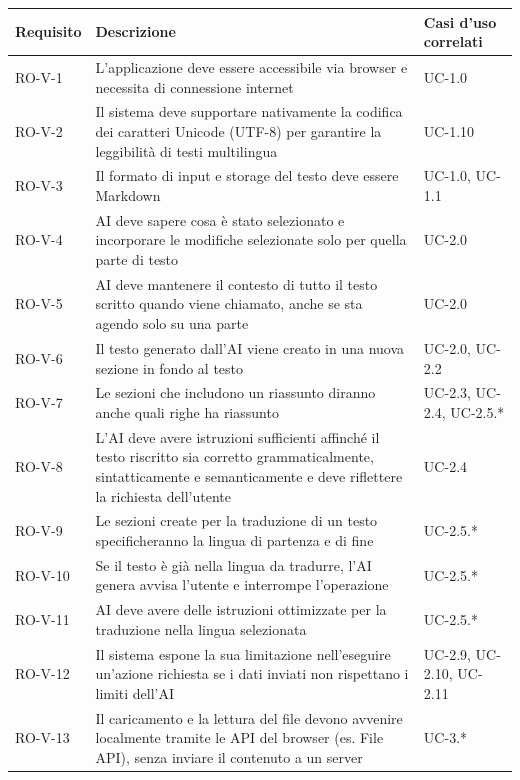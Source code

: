 \documentclass[11pt,a4paper]{article}
\begin{document}
\begin{longtable}{|p{}|>{\raggedright\arraybackslash}p{}|p{}|}
\hline
\textbf{Requisito} & \textbf{Descrizione} & \textbf{Casi d'uso correlati}\\
\hline

RO-V-1 & L'applicazione deve essere accessibile via browser e necessita di connessione internet & UC-1.0 \\
\hline
RO-V-2 & Il sistema deve supportare nativamente la codifica dei caratteri Unicode (UTF-8) per garantire la leggibilità di testi multilingua & UC-1.10 \\
\hline
RO-V-3 & Il formato di input e storage del testo deve essere Markdown & UC-1.0, UC-1.1 \\
\hline
RO-V-4 & AI deve sapere cosa è stato selezionato e incorporare le modifiche selezionate solo per quella parte di testo & UC-2.0 \\
\hline
RO-V-5 & AI deve mantenere il contesto di tutto il testo scritto quando viene chiamato, anche se sta agendo solo su una parte & UC-2.0 \\
\hline
RO-V-6 & Il testo generato dall'AI viene creato in una nuova sezione in fondo al testo & UC-2.0, UC-2.2 \\
\hline
RO-V-7 & Le sezioni che includono un riassunto diranno anche quali righe ha riassunto & UC-2.3, UC-2.4, UC-2.5.* \\
\hline
RO-V-8 & L'AI deve avere istruzioni sufficienti affinché il testo riscritto sia corretto grammaticalmente, sintatticamente e semanticamente e deve riflettere la richiesta dell'utente & UC-2.4 \\
\hline
RO-V-9 & Le sezioni create per la traduzione di un testo specificheranno la lingua di partenza e di fine & UC-2.5.* \\
\hline
RO-V-10 & Se il testo è già nella lingua da tradurre, l'AI genera avvisa l'utente e interrompe l'operazione & UC-2.5.* \\
\hline
RO-V-11 & AI deve avere delle istruzioni ottimizzate per la traduzione nella lingua selezionata & UC-2.5.* \\
\hline
RO-V-12 & Il sistema espone la sua limitazione nell'eseguire un'azione richiesta se i dati inviati non rispettano i limiti dell'AI & UC-2.9, UC-2.10, UC-2.11 \\
\hline
RO-V-13 & Il caricamento e la lettura del file devono avvenire localmente tramite le API del browser (es. File API), senza inviare il contenuto a un server & UC-3.* \\

\end{longtable}
\end{document}
